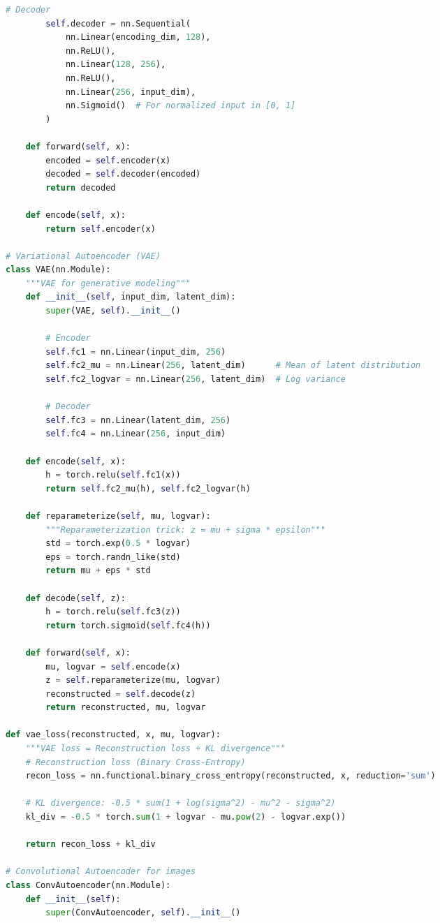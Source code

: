 \documentclass[8pt,landscape]{article}
\begin{document}
\begin{multicols}{3}
\begin{lstlisting}[language=Python]
        # Decoder
        self.decoder = nn.Sequential(
            nn.Linear(encoding_dim, 128),
            nn.ReLU(),
            nn.Linear(128, 256),
            nn.ReLU(),
            nn.Linear(256, input_dim),
            nn.Sigmoid()  # For normalized input in [0, 1]
        )

    def forward(self, x):
        encoded = self.encoder(x)
        decoded = self.decoder(encoded)
        return decoded

    def encode(self, x):
        return self.encoder(x)

# Variational Autoencoder (VAE)
class VAE(nn.Module):
    """VAE for generative modeling"""
    def __init__(self, input_dim, latent_dim):
        super(VAE, self).__init__()

        # Encoder
        self.fc1 = nn.Linear(input_dim, 256)
        self.fc2_mu = nn.Linear(256, latent_dim)      # Mean of latent distribution
        self.fc2_logvar = nn.Linear(256, latent_dim)  # Log variance

        # Decoder
        self.fc3 = nn.Linear(latent_dim, 256)
        self.fc4 = nn.Linear(256, input_dim)

    def encode(self, x):
        h = torch.relu(self.fc1(x))
        return self.fc2_mu(h), self.fc2_logvar(h)

    def reparameterize(self, mu, logvar):
        """Reparameterization trick: z = mu + sigma * epsilon"""
        std = torch.exp(0.5 * logvar)
        eps = torch.randn_like(std)
        return mu + eps * std

    def decode(self, z):
        h = torch.relu(self.fc3(z))
        return torch.sigmoid(self.fc4(h))

    def forward(self, x):
        mu, logvar = self.encode(x)
        z = self.reparameterize(mu, logvar)
        reconstructed = self.decode(z)
        return reconstructed, mu, logvar

def vae_loss(reconstructed, x, mu, logvar):
    """VAE loss = Reconstruction loss + KL divergence"""
    # Reconstruction loss (Binary Cross-Entropy)
    recon_loss = nn.functional.binary_cross_entropy(reconstructed, x, reduction='sum')

    # KL divergence: -0.5 * sum(1 + log(sigma^2) - mu^2 - sigma^2)
    kl_div = -0.5 * torch.sum(1 + logvar - mu.pow(2) - logvar.exp())

    return recon_loss + kl_div

# Convolutional Autoencoder for images
class ConvAutoencoder(nn.Module):
    def __init__(self):
        super(ConvAutoencoder, self).__init__()


\end{lstlisting}
\end{multicols}
\end{document}
